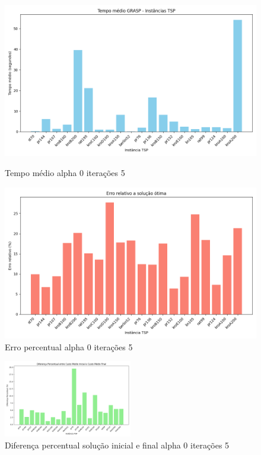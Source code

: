 \documentclass[10pt]{extarticle} %
\begin{document}
\begin{figure}[H]
    \centering
        \begin{minipage}{0.5\textwidth}
        \centering
        \includegraphics[width=1\textwidth]{./plots/average_times_saida_00_5.log.png}
        \caption{Tempo médio alpha 0 iterações 5}
        \label{fig:Tempo médio alpha 0 iterações 5}
    \end{minipage}\hfill
    \begin{minipage}{0.5\textwidth}
        \centering
        \includegraphics[width=1.0\textwidth]{./plots/solution_comparison_saida_00_5.log.png}
        \caption{Erro percentual alpha 0 iterações 5}
        \label{fig:Erro percentual alpha 0 iterações 5}
    \end{minipage}

\end{figure}

\begin{figure}[H]
    \centering
    \includegraphics[width=0.5\textwidth]{./plots/path_difference_saida_00_5.log.png}
    \caption{Diferença percentual solução inicial e final alpha 0 iterações 5}
    \label{fig:Diferença percentual solução inicial e final alpha 0 iterações 5}
\end{figure}
\end{document}
